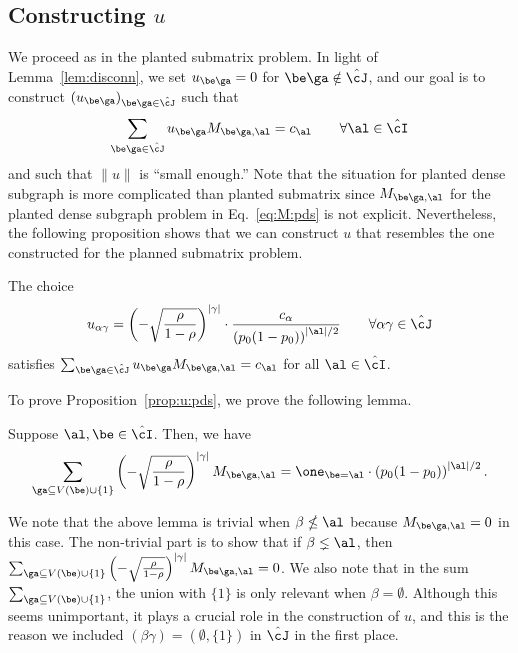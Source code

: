 \documentclass[11pt]{article}
\begin{document}
\subsection{Constructing $u$}

We proceed as in the planted submatrix problem. In light of Lemma~\ref{lem:disconn}, we set $u_{\be\ga}=0$ for $\be\ga\notin \hat\cJ$, and our goal is to construct $(u_{\be\ga})_{\be\ga\in \hat\cJ}$ such that
\begin{equation*}
    \sum_{\be\ga \in \hat\cJ} u_{\be\ga}M_{\be\ga,\al}=c_{\al} \qquad \forall\al\in \hat\cI
\end{equation*}
and such that $\|u\|$ is ``small enough.'' Note that the situation for planted dense subgraph is more complicated than planted submatrix since $M_{\be \ga,\al}$ for the planted dense subgraph problem in Eq.~\eqref{eq:M:pds} is not explicit. Nevertheless, the following proposition shows that we can construct $u$ that resembles the one constructed for the planned submatrix problem.
\begin{proposition}\label{prop:u:pds}
    The choice
    \[
    u_{\alpha\gamma} = \left(-\sqrt{\frac{\rho}{1-\rho}}\right)^{|\gamma|} \cdot \frac{c_\alpha}{\left(p_0(1-p_0)\right)^{|\al|/2}} \qquad \forall \alpha\gamma \in \hat\cJ
    \]
    satisfies $\sum_{\be\ga \in \hat\cJ} u_{\be\ga}M_{\be\ga,\al}=c_{\al}$ for all $\al\in \hat\cI$.
\end{proposition}
To prove Proposition~\ref{prop:u:pds}, we prove the following lemma.
\begin{lemma}\label{lem:crucial:identity}
    Suppose $\al,\be\in \hat\cI$. Then, we have
    \[
    \sum_{\ga \subseteq V(\be)\cup\{1\}}\left(-\sqrt{\frac{\rho}{1-\rho}}\right)^{|\gamma|}M_{\be\ga,\al}=\one_{\be=\al}\cdot \left(p_0(1-p_0)\right)^{|\al|/2}.
    \]
\end{lemma}
\noindent We note that the above lemma is trivial when $\beta \nleq \al$ because $M_{\be\ga,\al}=0$ in this case. The non-trivial part is to show that if $\beta\lneq \al$, then $\sum_{\ga \subseteq V(\be)\cup\{1\}}\left(-\sqrt{\frac{\rho}{1-\rho}}\right)^{|\gamma|}M_{\be\ga,\al}=0$. We also note that in the sum $\sum_{\ga \subseteq V(\be)\cup\{1\}}$, the union with $\{1\}$ is only relevant when $\beta=\emptyset$. Although this seems unimportant, it plays a crucial role in the construction of $u$, and this is the reason we included $(\beta \gamma)=(\emptyset, \{1\})$ in $\hat\cJ$ in the first place.
\end{document}
